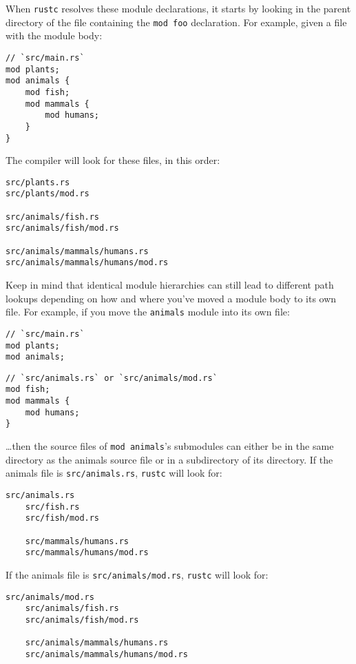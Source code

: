\documentclass[]{article}
\begin{document}
When \texttt{rustc} resolves these module declarations, it starts by
looking in the parent directory of the file containing the
\texttt{mod foo} declaration. For example, given a file with the module
body:

\begin{verbatim}
// `src/main.rs`
mod plants;
mod animals {
    mod fish;
    mod mammals {
        mod humans;
    }
}
\end{verbatim}

The compiler will look for these files, in this order:

\begin{verbatim}
src/plants.rs
src/plants/mod.rs

src/animals/fish.rs
src/animals/fish/mod.rs

src/animals/mammals/humans.rs
src/animals/mammals/humans/mod.rs
\end{verbatim}

Keep in mind that identical module hierarchies can still lead to
different path lookups depending on how and where you've moved a module
body to its own file. For example, if you move the \texttt{animals}
module into its own file:

\begin{verbatim}
// `src/main.rs`
mod plants;
mod animals;
\end{verbatim}

\begin{verbatim}
// `src/animals.rs` or `src/animals/mod.rs`
mod fish;
mod mammals {
    mod humans;
}
\end{verbatim}

\ldots{}then the source files of \texttt{mod animals}'s submodules can
either be in the same directory as the animals source file or in a
subdirectory of its directory. If the animals file is
\texttt{src/animals.rs}, \texttt{rustc} will look for:

\begin{verbatim}
src/animals.rs
    src/fish.rs
    src/fish/mod.rs

    src/mammals/humans.rs
    src/mammals/humans/mod.rs
\end{verbatim}

If the animals file is \texttt{src/animals/mod.rs}, \texttt{rustc} will
look for:

\begin{verbatim}
src/animals/mod.rs
    src/animals/fish.rs
    src/animals/fish/mod.rs

    src/animals/mammals/humans.rs
    src/animals/mammals/humans/mod.rs
\end{verbatim}
\end{document}
